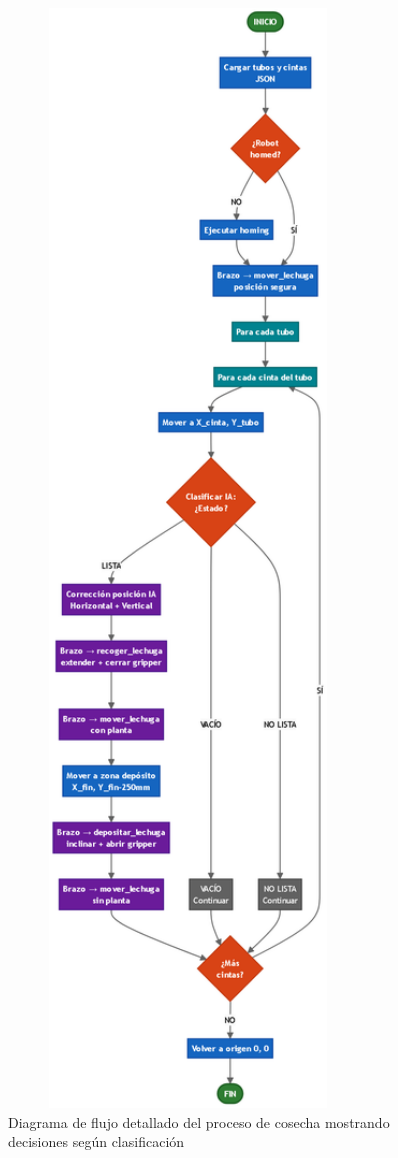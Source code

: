 \begin{figure}[H]
    \centering
    \includegraphics[width=0.85\textwidth]{imagenes/diagrama_flujo_cosecha.png}
    \caption{Diagrama de flujo detallado del proceso de cosecha mostrando decisiones según clasificación}
    \label{fig:flujo_cosecha}
\end{figure}

